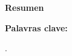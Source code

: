 \vspace{1cm}
\begin{center}
{\fontsize{14}{16}\selectfont\bfseries \MakeUppercase
\TituloCompletoArtigo
\par}

\vspace{12pt}
{\fontsize{10}{12}\selectfont \bfseries 
\AutoresAfiliacionesArtigo
\par}

\vspace{2mm}
{\fontsize{10}{11}\selectfont 
\AfiliacionesArtigo
\par}
\end{center}
		{\fontsize{11}{13}\selectfont 
		\textbf{Resumen}
		\vspace{-2mm}
		
		\ResumenArtigo
		\par}
		\vspace{0.1\baselineskip} \fontsize{11}{13}\selectfont 
		\textbf{Palavras clave: }{\fontsize{11}{13}\selectfont 
		\PalavrasClaveArtigo.
		\par}
